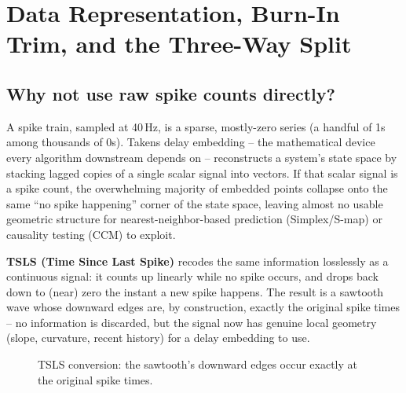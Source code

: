 \documentclass[11pt]{article}
\begin{document}
\newpage
\section{Data Representation, Burn-In Trim, and the Three-Way Split}
\label{sec:split}

\subsection{Why not use raw spike counts directly?}
A spike train, sampled at 40\,Hz, is a sparse, mostly-zero series (a handful of 1s among thousands of 0s). Takens delay embedding -- the mathematical device every algorithm downstream depends on -- reconstructs a system's state space by stacking lagged copies of a single scalar signal into vectors. If that scalar signal is a spike count, the overwhelming majority of embedded points collapse onto the same ``no spike happening'' corner of the state space, leaving almost no usable geometric structure for nearest-neighbor-based prediction (Simplex/S-map) or causality testing (CCM) to exploit.

\textbf{TSLS (Time Since Last Spike)} recodes the same information losslessly as a continuous signal: it counts up linearly while no spike occurs, and drops back down to (near) zero the instant a new spike happens. The result is a sawtooth wave whose downward edges are, by construction, exactly the original spike times -- no information is discarded, but the signal now has genuine local geometry (slope, curvature, recent history) for a delay embedding to use.

\begin{figure}[h]
\centering
{}
\caption{TSLS conversion: the sawtooth's downward edges occur exactly at the original spike times.}
\label{fig:tsls-sawtooth}
\end{figure}
\end{document}
